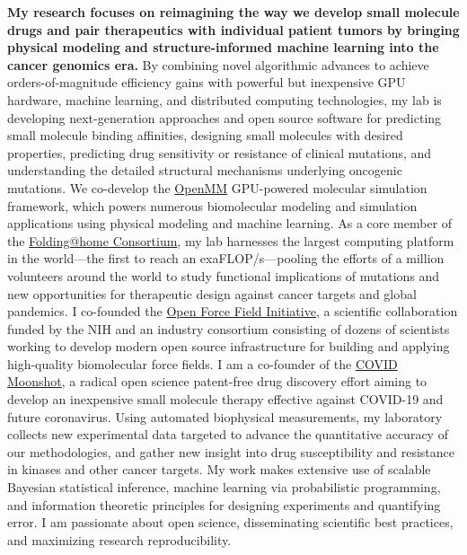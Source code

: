 \documentclass[10pt]{article}
\begin{document}
{\bf My research focuses on reimagining the way we develop small molecule drugs and pair therapeutics with individual patient tumors by bringing physical modeling and structure-informed machine learning into the cancer genomics era.}
By combining novel algorithmic advances to achieve orders-of-magnitude efficiency gains with powerful but inexpensive GPU hardware, machine learning, and distributed computing technologies, my lab is developing next-generation approaches and open source software for predicting small molecule binding affinities, designing small molecules with desired properties, predicting drug sensitivity or resistance of clinical mutations, and understanding the detailed structural mechanisms underlying oncogenic mutations.
We co-develop the \href{http://openmm.org}{OpenMM} GPU-powered molecular simulation framework, which powers numerous biomolecular modeling and simulation applications using physical modeling and machine learning. 
As a core member of the \href{https://foldingathome.stanford.edu/about/the-foldinghome-consortium/}{Folding@home Consortium}, my lab harnesses the largest computing platform in the world---the first to reach an exaFLOP/s---pooling the efforts of a million volunteers around the world to study functional implications of mutations and new opportunities for therapeutic design against cancer targets and global pandemics.
I co-founded the \href{http://openforcefield.org}{Open Force Field Initiative}, a scientific collaboration funded by the NIH and an industry consortium consisting of dozens of scientists working to develop modern open source infrastructure for building and applying high-quality biomolecular force fields.
I am a co-founder of the \href{http://postera.ai/covid}{COVID Moonshot}, a radical open science patent-free drug discovery effort aiming to develop an inexpensive small molecule therapy effective against COVID-19 and future coronavirus.
Using automated biophysical measurements, my laboratory collects new experimental data targeted to advance the quantitative accuracy of our methodologies, and gather new insight into drug susceptibility and resistance in kinases and other cancer targets.
My work makes extensive use of scalable Bayesian statistical inference, machine learning via probabilistic programming, and information theoretic principles for designing experiments and quantifying error.
I am passionate about open science, disseminating scientific best practices, and maximizing research reproducibility.
\end{document}
